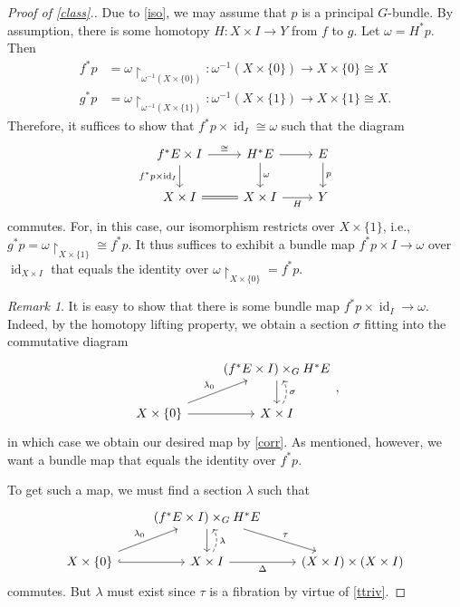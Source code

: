\documentclass[10pt,letterpaper,cm]{nupset}
\theoremstyle{definition}
\theoremstyle{theorem}
\theoremstyle{remark}
\newtheorem{remark}[defn]{Remark}
\newcommand{\1}{\mathbb{1}}
\newcommand{\0}{\vec 0}
\DeclareMathOperator{\id}{id}
\begin{document}
\begin{proof}[Proof of \cref{class}.]
Due to \cref{iso},  we may assume that $p$ is a principal $G$-bundle.  By assumption, there is some homotopy $H : X \times I \to Y$ from $f$ to $g$.
Let $\omega=  H^{\ast}{p}$. Then 
\begin{align*}
f^{\ast}{p} &  = \omega\restriction_{\omega^{-1}\left(X\times \{0\}\right)} : \omega^{-1}\left(X\times \{0\}\right) \to X\times \{0\} \cong X
\\ g^{\ast}{p}  & = \omega\restriction_{ \omega^{-1}\left(X\times \{1\}\right) } : \omega^{-1}\left(X\times \{1\}\right) \to X\times \{1\} \cong X.
\end{align*}
Therefore, it suffices to show that $f^{\ast}{p}\times \id_I \cong \omega $ such that the diagram
\[
\begin{tikzcd}
f^{\ast}{E}\times I \arrow[r, "\cong"]  \arrow[d, "f^{\ast}{p}\times \id_I"']                        & H^{\ast}{E} \arrow[r] \arrow[d, "\omega"] & E \arrow[d, "p"] \\
X\times I \arrow[r, equals] & X\times I \arrow[r, "H"']                      & Y               
\end{tikzcd}
\] commutes. For, in this case, our isomorphism restricts over $X \times \{1\}$, i.e., $g^{\ast}{p} = \omega\restriction_{X\times \{1\}} \cong f^{\ast}{p}$. It thus suffices to exhibit a bundle map $f^{\ast}{p} \times I\to \omega $ over $\id_{X \times I}$ that equals the identity over $\omega\restriction_{X\times \{0\}} = f^{\ast}{p}$.

\begin{remark}
It is easy to show that there is some bundle map $f^{\ast}{p}\times \id_I \to \omega$.  Indeed, by the homotopy lifting property, we obtain a section $\sigma$ fitting into the commutative diagram
\[
\begin{tikzcd}
                                   & \left(f^{\ast}{E}\times I\right) \times_G H^{\ast}{E} \arrow[d] \\
X\times \{0\} \arrow[r] \arrow[ru, "\lambda_0"] & X\times I \arrow[u, "\sigma"', dashed, bend right]             
\end{tikzcd}
,\] in which case we obtain our desired map by \cref{corr}. As mentioned, however, we want a bundle map that  equals the identity over $f^{\ast}{p}$.
\end{remark}

To get such a map, we must find a section $\lambda$ such that
\[
\begin{tikzcd}
                                                      & \left(f^{\ast}{E} \times I\right) \times_G H^{\ast}{E} \arrow[rd, "\tau"] \arrow[d] &                                                       \\
X\times \{0\} \arrow[ru, "\lambda_0"] \arrow[r, hook] & X\times I \arrow[r, "\Delta"'] \arrow[u, "\lambda"', dashed, bend right]            & \left(X\times I\right) \times \left(X \times I\right)
\end{tikzcd}
\] commutes. But  $\lambda$ must exist since $\tau$ is a fibration by virtue of \cref{ttriv}. 

\end{proof}
\end{document}
